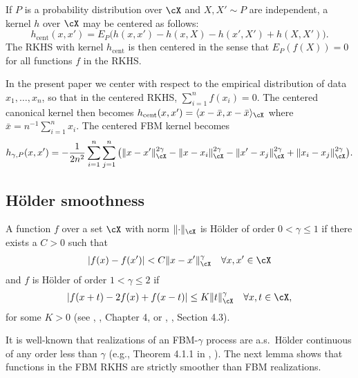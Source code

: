 \documentclass[preprint,12pt,authoryear]{elsarticle}
\DeclarePairedDelimiter{\abs}{\lvert}{\rvert}
\DeclarePairedDelimiter{\norm}{\lVert}{\rVert}
\begin{document}
If $P$ is a probability distribution over $\cX$ and $X,X'\sim P$ are independent, a kernel $h$ over $\cX$ may be centered as follows:
\[  h_\text{cent}(x,x') = E_P(h(x,x')-h(x,X)-h(x',X')+h(X,X')\big).  \]
The RKHS with kernel $h_\text{cent}$ is then centered in the sense that $E_P(f(X))=0$ for all functions $f$ in the RKHS.

In the present paper we center with respect to the empirical distribution of data $x_1,\ldots,x_n$, so that in the centered RKHS, $\sum_{i=1}^nf(x_i)=0$.
The centered canonical kernel then becomes $h_\text{cent}(x,x')=\langle x-\bar x,x-\bar x\rangle_\cX$ where $\bar x=n^{-1}\sum_{i=1}^nx_i$. The centered FBM kernel becomes
\begin{eqnarray}\label{smooth}
h_{\gamma,P}(x,x') =  -\frac1{2n^2}\sum_{i=1}^n\sum_{j=1}^n\big(\norm{x-x'}_\cX^{2\gamma}-\norm{x-x_i}_\cX^{2\gamma}-\norm{x'-x_j}_\cX^{2\gamma}+\norm{x_i-x_j}_\cX^{2\gamma}\big).
\end{eqnarray}





\subsection{H\"older smoothness}\label{sec-hol}

A function $f$ over a set $\cX$ with norm $\norm{\cdot}_\cX$ is H\"older of order $0<\gamma\le 1$ if there exists a $C>0$ such that
\begin{eqnarray}\label{holder}
\abs{f(x) - f(x')}  < C\norm{x-x'}_\cX^\gamma \quad \forall x,x'\in\cX
\end{eqnarray}
and $f$ is H\"older of order $1<\gamma\le 2$ if
\begin{align}\label{holder2}
\left|f(x+t)-2f(x)+f(x-t)\right| \le K\norm{t}_\cX^\gamma  \quad\forall x,t\in\cX,
\end{align}
for some $K>0$ (see \citeauthor{gt98}, \citeyear{gt98}, Chapter 4, or \citeauthor{stein70}, \citeyear{stein70}, Section 4.3).


It is well-known that realizations of an FBM-$\gamma$ process are a.s.\ H\"older continuous of any order less than $\gamma$ (e.g., Theorem 4.1.1 in \citeauthor{em02}, \citeyear{em02}). The next lemma shows that functions in the FBM RKHS are strictly smoother than FBM realizations.
\end{document}
